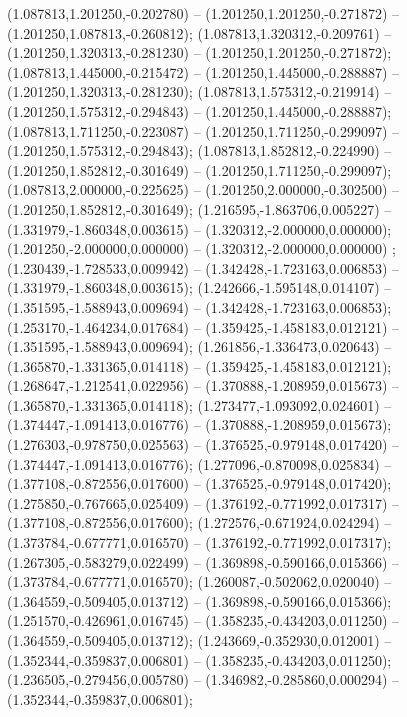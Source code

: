  (1.087813,1.201250,-0.202780) -- (1.201250,1.201250,-0.271872) -- (1.201250,1.087813,-0.260812);
 (1.087813,1.320312,-0.209761) -- (1.201250,1.320313,-0.281230) -- (1.201250,1.201250,-0.271872);
 (1.087813,1.445000,-0.215472) -- (1.201250,1.445000,-0.288887) -- (1.201250,1.320313,-0.281230);
 (1.087813,1.575312,-0.219914) -- (1.201250,1.575312,-0.294843) -- (1.201250,1.445000,-0.288887);
 (1.087813,1.711250,-0.223087) -- (1.201250,1.711250,-0.299097) -- (1.201250,1.575312,-0.294843);
 (1.087813,1.852812,-0.224990) -- (1.201250,1.852812,-0.301649) -- (1.201250,1.711250,-0.299097);
 (1.087813,2.000000,-0.225625) -- (1.201250,2.000000,-0.302500) -- (1.201250,1.852812,-0.301649);
 (1.216595,-1.863706,0.005227) -- (1.331979,-1.860348,0.003615) -- (1.320312,-2.000000,0.000000);
 (1.201250,-2.000000,0.000000) -- (1.320312,-2.000000,0.000000) ;
 (1.230439,-1.728533,0.009942) -- (1.342428,-1.723163,0.006853) -- (1.331979,-1.860348,0.003615);
 (1.242666,-1.595148,0.014107) -- (1.351595,-1.588943,0.009694) -- (1.342428,-1.723163,0.006853);
 (1.253170,-1.464234,0.017684) -- (1.359425,-1.458183,0.012121) -- (1.351595,-1.588943,0.009694);
 (1.261856,-1.336473,0.020643) -- (1.365870,-1.331365,0.014118) -- (1.359425,-1.458183,0.012121);
 (1.268647,-1.212541,0.022956) -- (1.370888,-1.208959,0.015673) -- (1.365870,-1.331365,0.014118);
 (1.273477,-1.093092,0.024601) -- (1.374447,-1.091413,0.016776) -- (1.370888,-1.208959,0.015673);
 (1.276303,-0.978750,0.025563) -- (1.376525,-0.979148,0.017420) -- (1.374447,-1.091413,0.016776);
 (1.277096,-0.870098,0.025834) -- (1.377108,-0.872556,0.017600) -- (1.376525,-0.979148,0.017420);
 (1.275850,-0.767665,0.025409) -- (1.376192,-0.771992,0.017317) -- (1.377108,-0.872556,0.017600);
 (1.272576,-0.671924,0.024294) -- (1.373784,-0.677771,0.016570) -- (1.376192,-0.771992,0.017317);
 (1.267305,-0.583279,0.022499) -- (1.369898,-0.590166,0.015366) -- (1.373784,-0.677771,0.016570);
 (1.260087,-0.502062,0.020040) -- (1.364559,-0.509405,0.013712) -- (1.369898,-0.590166,0.015366);
 (1.251570,-0.426961,0.016745) -- (1.358235,-0.434203,0.011250) -- (1.364559,-0.509405,0.013712);
 (1.243669,-0.352930,0.012001) -- (1.352344,-0.359837,0.006801) -- (1.358235,-0.434203,0.011250);
 (1.236505,-0.279456,0.005780) -- (1.346982,-0.285860,0.000294) -- (1.352344,-0.359837,0.006801);
